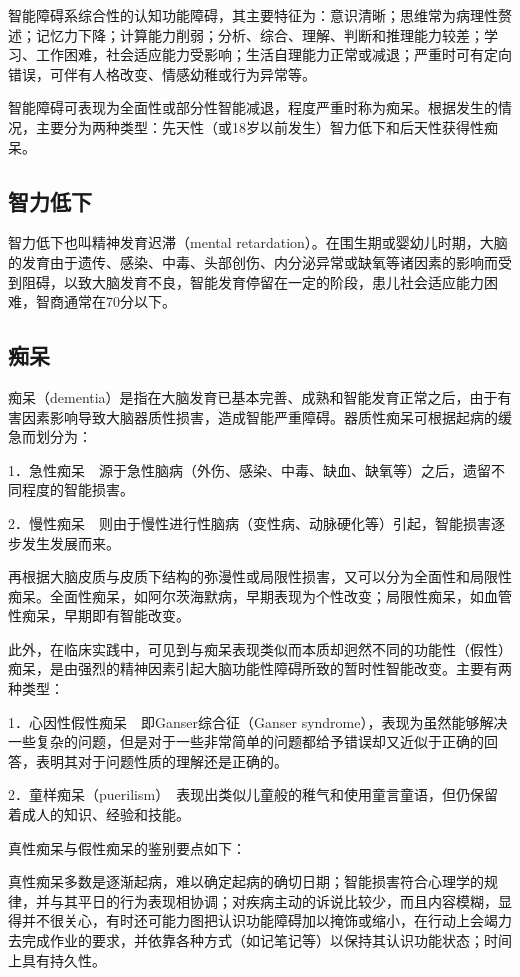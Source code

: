智能障碍系综合性的认知功能障碍，其主要特征为：意识清晰；思维常为病理性赘述；记忆力下降；计算能力削弱；分析、综合、理解、判断和推理能力较差；学习、工作困难，社会适应能力受影响；生活自理能力正常或减退；严重时可有定向错误，可伴有人格改变、情感幼稚或行为异常等。

智能障碍可表现为全面性或部分性智能减退，程度严重时称为痴呆。根据发生的情况，主要分为两种类型：先天性（或18岁以前发生）智力低下和后天性获得性痴呆。

\subsection{智力低下}

智力低下也叫精神发育迟滞（mental
retardation）。在围生期或婴幼儿时期，大脑的发育由于遗传、感染、中毒、头部创伤、内分泌异常或缺氧等诸因素的影响而受到阻碍，以致大脑发育不良，智能发育停留在一定的阶段，患儿社会适应能力困难，智商通常在70分以下。

\subsection{痴呆}

痴呆（dementia）是指在大脑发育已基本完善、成熟和智能发育正常之后，由于有害因素影响导致大脑器质性损害，造成智能严重障碍。器质性痴呆可根据起病的缓急而划分为：

1．急性痴呆　源于急性脑病（外伤、感染、中毒、缺血、缺氧等）之后，遗留不同程度的智能损害。

2．慢性痴呆　则由于慢性进行性脑病（变性病、动脉硬化等）引起，智能损害逐步发生发展而来。

再根据大脑皮质与皮质下结构的弥漫性或局限性损害，又可以分为全面性和局限性痴呆。全面性痴呆，如阿尔茨海默病，早期表现为个性改变；局限性痴呆，如血管性痴呆，早期即有智能改变。

此外，在临床实践中，可见到与痴呆表现类似而本质却迥然不同的功能性（假性）痴呆，是由强烈的精神因素引起大脑功能性障碍所致的暂时性智能改变。主要有两种类型：

1．心因性假性痴呆　即Ganser综合征（Ganser
syndrome），表现为虽然能够解决一些复杂的问题，但是对于一些非常简单的问题都给予错误却又近似于正确的回答，表明其对于问题性质的理解还是正确的。

2．童样痴呆（puerilism）　表现出类似儿童般的稚气和使用童言童语，但仍保留着成人的知识、经验和技能。

真性痴呆与假性痴呆的鉴别要点如下：

真性痴呆多数是逐渐起病，难以确定起病的确切日期；智能损害符合心理学的规律，并与其平日的行为表现相协调；对疾病主动的诉说比较少，而且内容模糊，显得并不很关心，有时还可能力图把认识功能障碍加以掩饰或缩小，在行动上会竭力去完成作业的要求，并依靠各种方式（如记笔记等）以保持其认识功能状态；时间上具有持久性。

